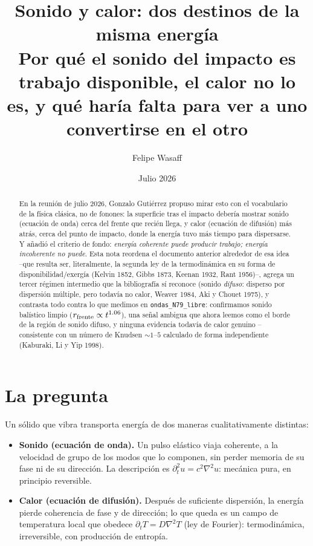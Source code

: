 \documentclass[11pt,a4paper]{article}
\title{\textbf{Sonido y calor: dos destinos de la misma energía}\\
\large Por qué el sonido del impacto es trabajo disponible, el calor no lo
es, y qué haría falta para ver a uno convertirse en el otro}
\author{Felipe Wasaff}
\date{Julio 2026}
\begin{document}
\maketitle

\begin{abstract}
En la reunión de julio 2026, Gonzalo Gutiérrez propuso mirar esto con el
vocabulario de la física clásica, no de fonones: la superficie tras el
impacto debería mostrar sonido (ecuación de onda) cerca del frente que
recién llega, y calor (ecuación de difusión) más atrás, cerca del punto de
impacto, donde la energía tuvo más tiempo para dispersarse. Y añadió el
criterio de fondo: \emph{energía coherente puede producir trabajo; energía
incoherente no puede}. Esta nota reordena el documento anterior alrededor
de esa idea --que resulta ser, literalmente, la segunda ley de la
termodinámica en su forma de disponibilidad/exergía (Kelvin 1852, Gibbs
1873, Keenan 1932, Rant 1956)--, agrega un tercer régimen intermedio que
la bibliografía sí reconoce (sonido \emph{difuso}: disperso por dispersión
múltiple, pero todavía no calor, Weaver 1984, Aki y Chouet 1975), y
contrasta todo contra lo que medimos en \texttt{ondas\_N79\_libre}:
confirmamos sonido balístico limpio ($r_{\rm frente}\propto t^{1.06}$), una
señal ambigua que ahora leemos como el borde de la región de sonido difuso,
y ninguna evidencia todavía de calor genuino --consistente con un número de
Knudsen $\sim1$--$5$ calculado de forma independiente (Kaburaki, Li y Yip
1998).
\end{abstract}

\tableofcontents

\section{La pregunta}

Un sólido que vibra transporta energía de dos maneras cualitativamente
distintas:

\begin{itemize}[leftmargin=1.4em]
\item \textbf{Sonido (ecuación de onda).} Un pulso elástico viaja
coherente, a la velocidad de grupo de los modos que lo componen, sin
perder memoria de su fase ni de su dirección. La descripción es
$\partial_t^2 u = c^2\nabla^2 u$: mecánica pura, en principio reversible.
\item \textbf{Calor (ecuación de difusión).} Después de suficiente
dispersión, la energía pierde coherencia de fase y de dirección; lo que
queda es un campo de temperatura local que obedece $\partial_t T =
D\nabla^2 T$ (ley de Fourier): termodinámica, irreversible, con
producción de entropía.
\end{itemize}
\end{document}
